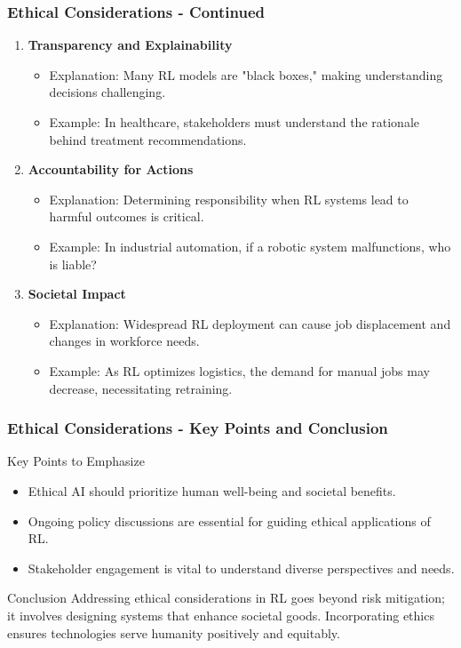 \documentclass[aspectratio=169]{beamer}
\begin{document}
\begin{frame}[fragile]
    \frametitle{Ethical Considerations - Continued}
    \begin{enumerate}[resume]
        \item \textbf{Transparency and Explainability}
            \begin{itemize}
                \item Explanation: Many RL models are "black boxes," making understanding decisions challenging.
                \item Example: In healthcare, stakeholders must understand the rationale behind treatment recommendations.
            \end{itemize}

        \item \textbf{Accountability for Actions}
            \begin{itemize}
                \item Explanation: Determining responsibility when RL systems lead to harmful outcomes is critical.
                \item Example: In industrial automation, if a robotic system malfunctions, who is liable?
            \end{itemize}

        \item \textbf{Societal Impact}
            \begin{itemize}
                \item Explanation: Widespread RL deployment can cause job displacement and changes in workforce needs.
                \item Example: As RL optimizes logistics, the demand for manual jobs may decrease, necessitating retraining.
            \end{itemize}
    \end{enumerate}
\end{frame}

\begin{frame}[fragile]
    \frametitle{Ethical Considerations - Key Points and Conclusion}
    \begin{block}{Key Points to Emphasize}
        \begin{itemize}
            \item Ethical AI should prioritize human well-being and societal benefits.
            \item Ongoing policy discussions are essential for guiding ethical applications of RL.
            \item Stakeholder engagement is vital to understand diverse perspectives and needs.
        \end{itemize}
    \end{block}

    \begin{block}{Conclusion}
        Addressing ethical considerations in RL goes beyond risk mitigation; 
        it involves designing systems that enhance societal goods. 
        Incorporating ethics ensures technologies serve humanity positively and equitably.
    \end{block}
\end{frame}
\end{document}
